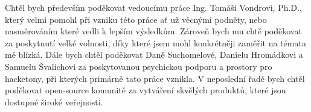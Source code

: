 \documentclass[czech,bachelor,unicode]{ctufit-thesis}
\begin{document}
 
\frontmatter\frontmatterinit %


\thispagestyle{empty}\cleardoublepage\maketitle %

\imprintpage %

\tableofcontents %
\listoffigures %
\begingroup
\let\clearpage\relax
\listoftables %
\lstlistoflistings %
\endgroup

\begin{acknowledgmentpage}
	Chtěl bych především poděkovat vedoucímu práce Ing. Tomáši Vondrovi, Ph.D., který velmi pomohl při vzniku této práce ať už věcnými podněty, nebo nasměrováním které vedli k lepším výsledkům. Zároveň bych mu chtě poděkovat za poskytnutí velké volnosti, díky které jsem mohl konkrétněji zaměřit na témata mě blízká.
    Dále bych chtěl poděkovat Daně Suchomelové, Danielu Hromádkovi a Samuelu Švalichovi za poskytovanou psychickou podporu a prostory pro hacketony, při kterých primárně tato práce vznikla.
    V neposlední řadě bych chtěl poděkovat open-source komunitě za vytváření skvělých produktů, které jsou dostupné široké veřejnosti. 
\end{acknowledgmentpage} 
\end{document}
